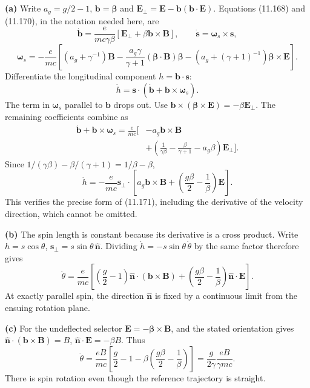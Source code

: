 \medskip\noindent\textbf{(a)} Write $a_g=g/2-1$, $\mathbf b=\hat{\boldsymbol\beta}$ and
$\mathbf E_\perp=\mathbf E-\mathbf b(\mathbf b\cdot\mathbf E)$.
Equations (11.168) and (11.170), in the notation needed here, are
\[
\dot{\mathbf b}=\frac e{mc\gamma\beta}
 [\mathbf E_\perp+\beta\mathbf b\times\mathbf B],
\qquad \dot{\mathbf s}=\boldsymbol\omega_s\times\mathbf s,
\]
\[
\boldsymbol\omega_s=-\frac e{mc}\left[
 (a_g+\gamma^{-1})\mathbf B
 -\frac{a_g\gamma}{\gamma+1}(\boldsymbol\beta\cdot\mathbf B)
  \boldsymbol\beta
 -(a_g+(\gamma+1)^{-1})\boldsymbol\beta\times\mathbf E\right].
\]
Differentiate the longitudinal component $h=\mathbf b\cdot\mathbf s$:
\[
\dot h=\mathbf s\cdot(\dot{\mathbf b}+\mathbf b\times\boldsymbol\omega_s).
\]
The term in $\boldsymbol\omega_s$ parallel to $\mathbf b$ drops
out.  Use
$\mathbf b\times(\boldsymbol\beta\times\mathbf E)=-\beta\mathbf E_\perp$.
The remaining coefficients combine as
\begin{align*}
\dot{\mathbf b}+\mathbf b\times\boldsymbol\omega_s
=\frac e{mc}\bigg[&-a_g\mathbf b\times\mathbf B\\
&+\left(\frac1{\gamma\beta}-\frac{\beta}{\gamma+1}
-a_g\beta\right)\mathbf E_\perp\bigg].
\end{align*}
Since $1/(\gamma\beta)-\beta/(\gamma+1)=1/\beta-\beta$,
\[
\boxed{\dot h=-\frac e{mc}\mathbf s_\perp\cdot
 \left[a_g\mathbf b\times\mathbf B+
 \left(\frac{g\beta}2-\frac1\beta\right)\mathbf E\right].}
\]
This verifies the precise form of (11.171), including the derivative
of the velocity direction, which cannot be omitted.

\medskip\noindent\textbf{(b)} The spin length is constant because its derivative is a cross
product.  Write
$h=s\cos\theta$, $\mathbf s_\perp=s\sin\theta\,\hat{\mathbf n}$.
Dividing $\dot h=-s\sin\theta\,\dot\theta$ by the same factor
therefore gives
\[
\boxed{\dot\theta=\frac e{mc}\left[
 \left(\frac g2-1\right)\hat{\mathbf n}\cdot(\mathbf b\times\mathbf B)
 +\left(\frac{g\beta}2-\frac1\beta\right)\hat{\mathbf n}\cdot\mathbf E
 \right].}
\]
At exactly parallel spin, the direction $\hat{\mathbf n}$ is fixed
by a continuous limit from the ensuing rotation plane.

\medskip\noindent\textbf{(c)} For the undeflected selector $\mathbf E=-\boldsymbol\beta\times\mathbf B$,
and the stated orientation gives
$\hat{\mathbf n}\cdot(\mathbf b\times\mathbf B)=B$,
$\hat{\mathbf n}\cdot\mathbf E=-\beta B$.  Thus
\[
\dot\theta=\frac{eB}{mc}
 \left[\frac g2-1-\beta\left(\frac{g\beta}2-\frac1\beta\right)\right]
=\boxed{\frac g{2\gamma}\frac{eB}{\gamma mc}.}
\]
There is spin rotation even though the reference trajectory is straight.

